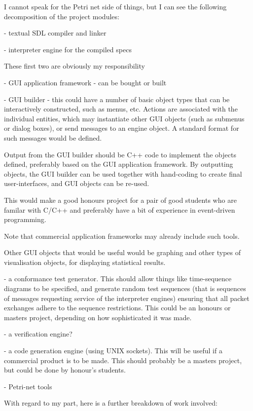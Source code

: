 I cannot speak for the Petri net side of things, but I can see
the following decomposition of the project modules:

  - textual SDL compiler and linker

  - interpreter engine for the compiled specs

These first two are obviously my responsibility

  - GUI application framework - can be bought or built

  - GUI builder - this could have  a number of basic object types that
	can be interactively constructed, such as menus, etc.
	Actions are associated with the individual entities,
	which may instantiate other GUI objects (such as submenus
	or dialog boxes), or send messages to an engine object.
	A standard format for such messages would be defined.

	Output from the GUI builder should be C++ code to implement
	the objects defined, preferably based on the GUI application
	framework. By outputting objects, the GUI builder can be
	used together with hand-coding to create final user-interfaces,
	and GUI objects can be re-used.

	This would make a good honours project for a pair of good
	students who are familar with C/C++ and preferably have
	a bit of experience in event-driven programming.

	Note that commercial application frameworks may already
	include such tools.

	Other GUI objects that would be useful would be graphing
	and other types of visualisation objects, for displaying
	statistical results.

  - a conformance test generator. This should allow things like
	time-sequence diagrams to be specified, and generate random
	test sequences (that is sequences of messages requesting
	service of the interpreter engines) ensuring that all 
	packet exchanges adhere to the sequence restrictions.
	This could be an honours or masters project, depending
	on how sophisticated it was made.

  - a verification engine?

  - a code generation engine (using UNIX sockets). This will be useful
	if a commercial product is to be made. This should probably
	be a masters project, but could be done by honour's students.
	
  - Petri-net tools

With regard to my part, here is a further breakdown of work involved:

